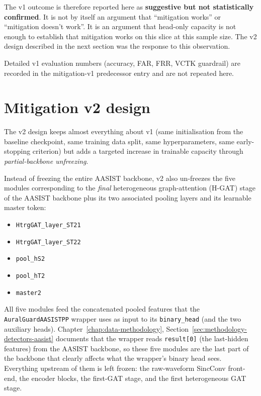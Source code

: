 The v1 outcome is therefore reported here as \textbf{suggestive but
not statistically confirmed}. It is not by itself an argument
that ``mitigation works'' or ``mitigation doesn't work''. It is an
argument that head-only capacity is not enough to establish that
mitigation works on this slice at this sample size. The v2 design
described in the next section was the response to this
observation.

Detailed v1 evaluation numbers (accuracy, FAR, FRR, VCTK
guardrail) are recorded in the mitigation-v1 predecessor entry
and are not repeated here.


\section{Mitigation v2 design}
\label{sec:mitigation-v2-design}

The v2 design keeps almost everything about v1 (same
initialisation from the baseline checkpoint, same training data
split, same hyperparameters, same early-stopping criterion) but
adds a targeted increase in trainable capacity through
\emph{partial-backbone unfreezing}.

Instead of freezing the entire AASIST backbone, v2 also
un-freezes the five modules corresponding to the \emph{final}
heterogeneous graph-attention (H-GAT) stage of the AASIST
backbone plus its two associated pooling layers and its
learnable master token:

\begin{itemize}
    \item \texttt{HtrgGAT\_layer\_ST21}
    \item \texttt{HtrgGAT\_layer\_ST22}
    \item \texttt{pool\_hS2}
    \item \texttt{pool\_hT2}
    \item \texttt{master2}
\end{itemize}

All five modules feed the concatenated pooled features that the
\texttt{AuralGuardAASISTPP} wrapper uses as input to its \texttt{binary\_head}
(and the two auxiliary heads). Chapter~\ref{chap:data-methodology}, Section~\ref{sec:methodology-detectors-aasist} documents
that the wrapper reads \texttt{result[0]} (the last-hidden features)
from the AASIST backbone, so these five modules are the last
part of the backbone that clearly affects what the wrapper's
binary head sees. Everything upstream of them is left frozen:
the raw-waveform SincConv front-end, the encoder blocks, the
first-GAT stage, and the first heterogeneous GAT stage.

